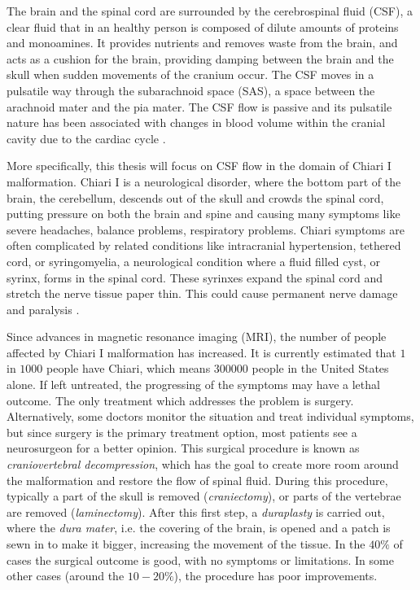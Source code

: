 \documentclass[a4paper,11pt,oneside]{book}
\begin{document}
The brain and the spinal cord are surrounded by the cerebrospinal fluid (CSF), a clear fluid that in an healthy person is composed of dilute amounts of proteins and monoamines. It provides nutrients and removes waste from the brain, and acts as a cushion for the brain, providing damping between the brain and the skull when sudden movements of the cranium occur. The CSF moves in a pulsatile way through the subarachnoid space (SAS), a space between the arachnoid mater and the pia mater. The CSF flow is passive and its pulsatile nature has been associated with changes in blood volume within the cranial cavity due to the cardiac cycle \cite{silverthorn}.

More specifically, this thesis will focus on CSF flow in the domain of Chiari I malformation. Chiari I is a neurological disorder, where the bottom part of the brain, the cerebellum, descends out of the skull and crowds the spinal cord, putting pressure on both the brain and spine and causing many symptoms like severe headaches, balance problems, respiratory problems. Chiari symptoms are often complicated by related conditions like intracranial hypertension, tethered cord, or syringomyelia, a neurological condition where a fluid filled cyst, or syrinx, forms in the spinal cord. These syrinxes expand the spinal cord and stretch the nerve tissue paper thin. This could cause permanent nerve damage and paralysis \cite{chiari}.

Since advances in magnetic resonance imaging (MRI), the number of people affected by Chiari I malformation has increased. It is currently estimated that $1$ in $1000$ people have Chiari, which means $300000$ people in the United States alone. If left untreated, the progressing of the symptoms may have a lethal outcome. The only treatment which addresses the problem is surgery. Alternatively, some doctors monitor the situation and treat individual symptoms, but since surgery is the primary treatment option, most patients see a neurosurgeon for a better opinion. This surgical procedure is known as \textit{craniovertebral decompression}, which has the goal to create more room around the malformation and restore the flow of spinal fluid. During this procedure, typically a part of the skull is removed (\textit{craniectomy}), or parts of the vertebrae are removed (\textit{laminectomy}). After this first step, a \textit{duraplasty} is carried out, where the \textit{dura mater}, i.e. the covering of the brain, is opened and a patch is sewn in to make it bigger, increasing the movement of the tissue.
In the $40 \%$ of cases the surgical outcome is good, with no symptoms or limitations. In some other cases (around the $10-20 \%$), the procedure has poor improvements. 
\end{document}
